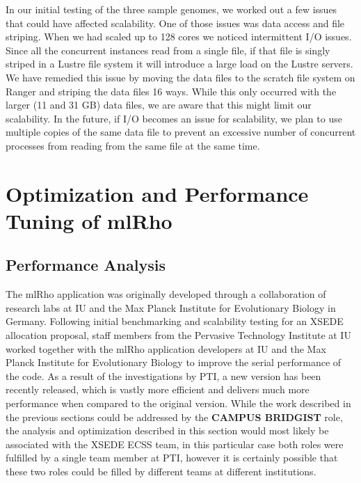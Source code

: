 \documentclass{sig-alternate}
\begin{document}
In our initial testing of the three sample genomes, we worked out a few issues that could have affected
scalability. One of those issues was data access and file striping. When we had scaled up to 128 cores we
noticed intermittent I/O issues. Since all the concurrent instances read from a single file, if that file is
singly striped in a Lustre file system it will introduce a large load on the Lustre servers. We have remedied
this issue by moving the data files to the scratch file system on Ranger and striping the data files 16
ways. While this only occurred with the larger (11 and 31 GB) data files, we are aware that this might limit
our scalability. In the future, if I/O becomes an issue for scalability, we plan to use multiple copies of the
same data file to prevent an excessive number of concurrent processes from reading from the same file at the same time.

\section{Optimization and Performance Tuning of mlRho}\label{sec:optimization}
\subsection{Performance Analysis}\label{subsec:analysis}
The mlRho application was originally developed through a collaboration of research labs at IU and the
Max Planck Institute for Evolutionary Biology in Germany. Following initial benchmarking and scalability
testing for an XSEDE allocation proposal, staff members from the Pervasive Technology Institute at IU worked
together with the mlRho application developers at IU and the Max Planck Institute for Evolutionary
Biology to improve the serial performance of the code. As a result of the investigations by PTI, a new version
has been recently released, which is vastly more efficient and delivers much more performance when compared to
the original version. While the work described in the previous sections could be addressed by the {\bf CAMPUS
  BRIDGIST} role, the analysis and optimization described in this section would most likely be associated with
the XSEDE ECSS team, in this particular case both roles were fulfilled by a single team member at PTI, however
it is certainly possible that these two roles could be filled by different teams at different institutions.
\end{document}
